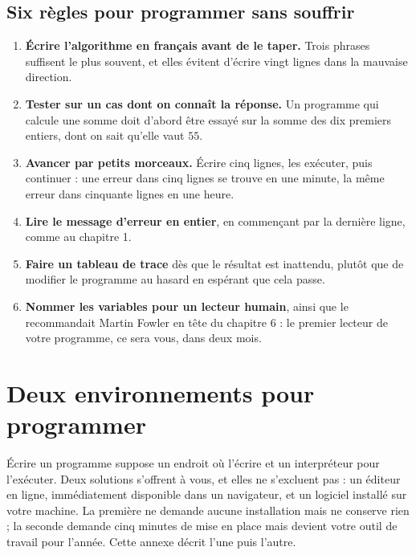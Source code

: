 \documentclass[a4paper,11pt,openany]{book}
\begin{document}
\section{Six règles pour programmer sans souffrir}

\begin{enumerate}[leftmargin=8mm,itemsep=1.5mm]
\item \textbf{Écrire l'algorithme en français avant de le taper.} Trois phrases suffisent le plus souvent, et elles évitent d'écrire vingt lignes dans la mauvaise direction.
\item \textbf{Tester sur un cas dont on connaît la réponse.} Un programme qui calcule une somme doit d'abord être essayé sur la somme des dix premiers entiers, dont on sait qu'elle vaut $55$.
\item \textbf{Avancer par petits morceaux.} Écrire cinq lignes, les exécuter, puis continuer : une erreur dans cinq lignes se trouve en une minute, la même erreur dans cinquante lignes en une heure.
\item \textbf{Lire le message d'erreur en entier}, en commençant par la dernière ligne, comme au chapitre 1.
\item \textbf{Faire un tableau de trace} dès que le résultat est inattendu, plutôt que de modifier le programme au hasard en espérant que cela passe.
\item \textbf{Nommer les variables pour un lecteur humain}, ainsi que le recommandait Martin Fowler en tête du chapitre 6 : le premier lecteur de votre programme, ce sera vous, dans deux mois.
\end{enumerate}
\chapter[Deux environnements]{Deux environnements pour programmer}

Écrire un programme suppose un endroit où l'écrire et un interpréteur pour l'exécuter. Deux solutions s'offrent à vous, et elles ne s'excluent pas : un éditeur en ligne, immédiatement disponible dans un navigateur, et un logiciel installé sur votre machine. La première ne demande aucune installation mais ne conserve rien ; la seconde demande cinq minutes de mise en place mais devient votre outil de travail pour l'année. Cette annexe décrit l'une puis l'autre.
\end{document}
